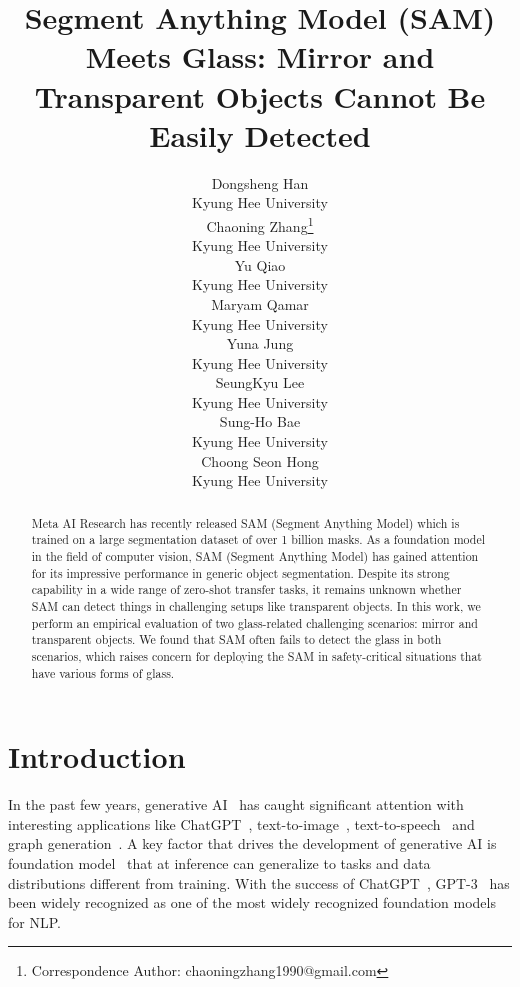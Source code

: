 \documentclass{article}
\title{Segment Anything Model (SAM) Meets Glass: Mirror and Transparent Objects Cannot Be Easily Detected}
\author{Dongsheng Han \\
	Kyung Hee University \\
 \And
Chaoning Zhang\thanks{Correspondence Author: chaoningzhang1990@gmail.com} \\
	Kyung Hee University\\
 \And
Yu Qiao \\
	Kyung Hee University\\
 \And
Maryam Qamar \\
	Kyung Hee University\\
  \And
Yuna Jung \\
	Kyung Hee University\\
\And
SeungKyu Lee \\
	Kyung Hee University\\
 \And
Sung-Ho Bae \\
	Kyung Hee University\\
\And
Choong Seon Hong \\
	Kyung Hee University\\
}
\begin{document}
\maketitle

\begin{abstract}
Meta AI Research has recently released SAM (Segment Anything Model) which is trained on a large segmentation dataset of over 1 billion masks. As a foundation model in the field of computer vision, SAM (Segment Anything Model) has gained attention for its impressive performance in generic object segmentation. Despite its strong capability in a wide range of zero-shot transfer tasks, it remains unknown whether SAM can detect things in challenging setups like transparent objects. In this work, we perform an empirical evaluation of two glass-related challenging scenarios: mirror and transparent objects. We found that SAM often fails to detect the glass in both scenarios, which raises concern for deploying the SAM in safety-critical situations that have various forms of glass. 
\end{abstract}



\section{Introduction}
In the past few years, generative AI~\cite{zhang2023complete} has caught significant attention with interesting applications like ChatGPT~\cite{zhang2023chatgpt}, text-to-image~\cite{zhang2023text}, text-to-speech~\cite{zhang2023audio} and graph generation~\cite{zhang2023graph_survey}. A key factor that drives the development of generative AI is foundation model~\cite{bommasani2021opportunities} that at inference can generalize to tasks and data distributions different from training. With the success of ChatGPT~\cite{zhang2023chatgpt}, GPT-3~\citep{brown2020language} has been widely recognized as one of the most widely recognized foundation models for NLP. 
\end{document}

